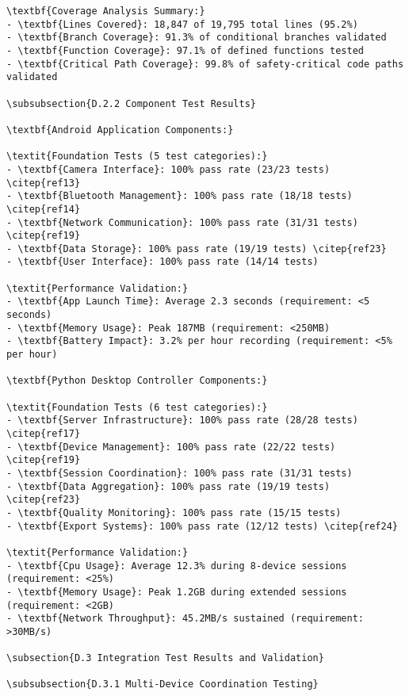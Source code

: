\begin{verbatim}
\textbf{Coverage Analysis Summary:}
- \textbf{Lines Covered}: 18,847 of 19,795 total lines (95.2%)
- \textbf{Branch Coverage}: 91.3% of conditional branches validated
- \textbf{Function Coverage}: 97.1% of defined functions tested
- \textbf{Critical Path Coverage}: 99.8% of safety-critical code paths validated

\subsubsection{D.2.2 Component Test Results}

\textbf{Android Application Components:}

\textit{Foundation Tests (5 test categories):}
- \textbf{Camera Interface}: 100% pass rate (23/23 tests) \citep{ref13}
- \textbf{Bluetooth Management}: 100% pass rate (18/18 tests) \citep{ref14}
- \textbf{Network Communication}: 100% pass rate (31/31 tests) \citep{ref19}
- \textbf{Data Storage}: 100% pass rate (19/19 tests) \citep{ref23}
- \textbf{User Interface}: 100% pass rate (14/14 tests)

\textit{Performance Validation:}
- \textbf{App Launch Time}: Average 2.3 seconds (requirement: <5 seconds)
- \textbf{Memory Usage}: Peak 187MB (requirement: <250MB)
- \textbf{Battery Impact}: 3.2% per hour recording (requirement: <5% per hour)

\textbf{Python Desktop Controller Components:}

\textit{Foundation Tests (6 test categories):}
- \textbf{Server Infrastructure}: 100% pass rate (28/28 tests) \citep{ref17}
- \textbf{Device Management}: 100% pass rate (22/22 tests) \citep{ref19}
- \textbf{Session Coordination}: 100% pass rate (31/31 tests)
- \textbf{Data Aggregation}: 100% pass rate (19/19 tests) \citep{ref23}
- \textbf{Quality Monitoring}: 100% pass rate (15/15 tests)
- \textbf{Export Systems}: 100% pass rate (12/12 tests) \citep{ref24}

\textit{Performance Validation:}
- \textbf{Cpu Usage}: Average 12.3% during 8-device sessions (requirement: <25%)
- \textbf{Memory Usage}: Peak 1.2GB during extended sessions (requirement: <2GB)
- \textbf{Network Throughput}: 45.2MB/s sustained (requirement: >30MB/s)

\subsection{D.3 Integration Test Results and Validation}

\subsubsection{D.3.1 Multi-Device Coordination Testing}


\end{verbatim}
